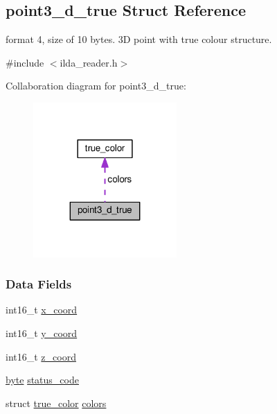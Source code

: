 \hypertarget{structpoint3__d__true}{}\subsection{point3\+\_\+d\+\_\+true Struct Reference}
\label{structpoint3__d__true}


format 4, size of 10 bytes. 3D point with true colour structure.  




{\ttfamily \#include $<$ilda\+\_\+reader.\+h$>$}



Collaboration diagram for point3\+\_\+d\+\_\+true\+:\nopagebreak
\begin{figure}[H]
\begin{center}
\leavevmode
\includegraphics[width=155pt]{structpoint3__d__true__coll__graph}
\end{center}
\end{figure}
\subsubsection*{Data Fields}
\begin{DoxyCompactItemize}
\item 
int16\+\_\+t \hyperlink{structpoint3__d__true_ae2fecb3111aaa9450526d3a8ac54cc2f}{x\+\_\+coord}
\item 
int16\+\_\+t \hyperlink{structpoint3__d__true_a3e9e88bc5533d72da6811340ce578f67}{y\+\_\+coord}
\item 
int16\+\_\+t \hyperlink{structpoint3__d__true_aad4fd09f85d4f8c7d7aa1bf80f7fc7c3}{z\+\_\+coord}
\item 
\hyperlink{ilda__reader_8h_a0c8186d9b9b7880309c27230bbb5e69d}{byte} \hyperlink{structpoint3__d__true_a05766432b1037ce6ddb34874df3245d7}{status\+\_\+code}
\item 
struct \hyperlink{structtrue__color}{true\+\_\+color} \hyperlink{structpoint3__d__true_a439d36e90be604aea553da6d944c4173}{colors}
\end{DoxyCompactItemize}


